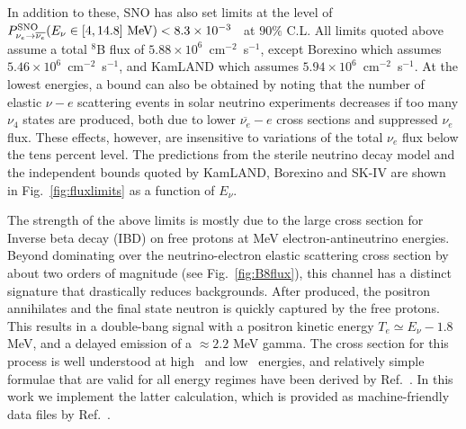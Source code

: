 \documentclass[
reprint,
superscriptaddress,
showpacs,
preprintnumbers,
nofootinbib,
nobibnotes,
amsmath,
amssymb, 
aps,
prd,
floatfix
]{revtex4-1}
\newcommand{\reffig}[1]{Fig.~\ref{#1}}
\begin{document}
In addition to these, SNO has also set limits at the level of $P^{\rm SNO}_{\nu_e \to \overline{\nu_e}} (E_\nu \in [4,14.8]\,\, \text{MeV}) < 8.3\times10^{-3}$~\cite{Aharmim:2004uf} at $90\%$ C.L. All limits quoted above assume a total $^8$B flux of $5.88 \times 10^{6}$~cm$^{-2}$~s$^{-1}$, except Borexino which assumes $5.46 \times 10^{6}$~cm$^{-2}$~s$^{-1}$, and KamLAND which assumes $5.94 \times 10^{6}$~cm$^{-2}$~s$^{-1}$. At the lowest energies, a bound can also be obtained by noting that the number of elastic $\nu - e $ scattering events in solar neutrino experiments decreases if too many $\nu_4$ states are produced, both due to lower $\overline{\nu_e}-e$ cross sections and suppressed $\nu_e$ flux. These effects, however, are insensitive to variations of the total $\nu_e$ flux below the tens percent level.
The predictions from the sterile neutrino decay model and the independent bounds quoted by KamLAND, Borexino and SK-IV are shown in \reffig{fig:fluxlimits} as a function of $E_\nu$.

The strength of the above limits is mostly due to the large cross section for Inverse beta decay (IBD) on free protons at MeV electron-antineutrino energies. Beyond dominating over the neutrino-electron elastic scattering cross section by about two orders of magnitude (see \reffig{fig:B8flux}), this channel has a distinct signature that drastically reduces backgrounds. After produced, the positron annihilates and the final state neutron is quickly captured by the free protons. This results in a double-bang signal with a positron kinetic energy $T_e \simeq E_\nu - 1.8$ MeV, and a delayed emission of a $\approx 2.2$ MeV gamma. The cross section for this process is well understood at high~\cite{LlewellynSmith:1971uhs} and low~\cite{Vogel:1999zy} energies, and relatively simple formulae that are valid for all energy regimes have been derived by Ref.~\cite{Strumia:2003zx}. In this work we implement the latter calculation, which is provided as machine-friendly data files by Ref.~\cite{Ankowski:2016oyj}.
\end{document}
